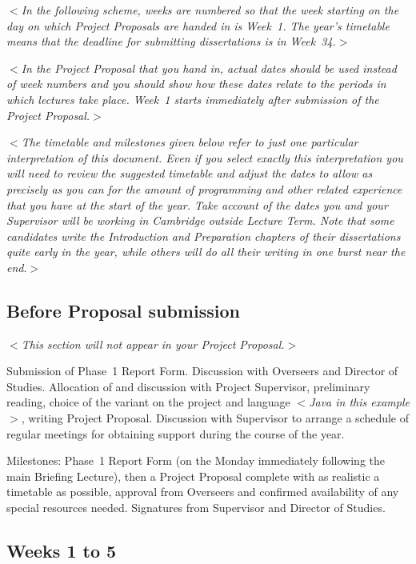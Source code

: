 \documentclass[12pt]{article}
\newcommand{\al}{$<$}
\newcommand{\ar}{$>$}
\begin{document}
\al\emph{In the following scheme, weeks are numbered so that the week
  starting on the day on which Project Proposals are handed in is
  Week~1.  The year's timetable means that the deadline for submitting
  dissertations is in Week~34.}\ar

\al\emph{In the Project Proposal that you hand in, {\rm actual dates}
  should be used instead of week numbers and you should show how these
  dates relate to the periods in which lectures take place. Week~1
  starts immediately after submission of the Project Proposal.}\ar

\al\emph{The timetable and milestones given below refer to just one
  particular interpretation of this document.  Even if you select
  exactly this interpretation you will need to review the suggested
  timetable and adjust the dates to allow as precisely as you can for
  the amount of programming and other related experience that you have
  at the start of the year.  Take account of the dates you and your
  Supervisor will be working in Cambridge outside Lecture Term.  Note
  that some candidates write the Introduction and Preparation chapters
  of their dissertations quite early in the year, while others will do
  all their writing in one burst near the end}.\ar


\subsection*{Before Proposal submission}

\al\emph{This section will not appear in your Project Proposal.}\ar
 
Submission of Phase~1 Report Form. Discussion with Overseers and
Director of Studies.  Allocation of and discussion with Project
Supervisor, preliminary reading, choice of the variant on the project
and language \al\emph{Java in this example\/}\ar, writing Project
Proposal.  Discussion with Supervisor to arrange a schedule of regular
meetings for obtaining support during the course of the year.

Milestones: Phase~1 Report Form (on the Monday immediately following
the main Briefing Lecture), then a Project Proposal complete with as
realistic a timetable as possible, approval from Overseers and
confirmed availability of any special resources needed. Signatures
from Supervisor and Director of Studies.


\subsection*{Weeks 1 to 5}
\end{document}

